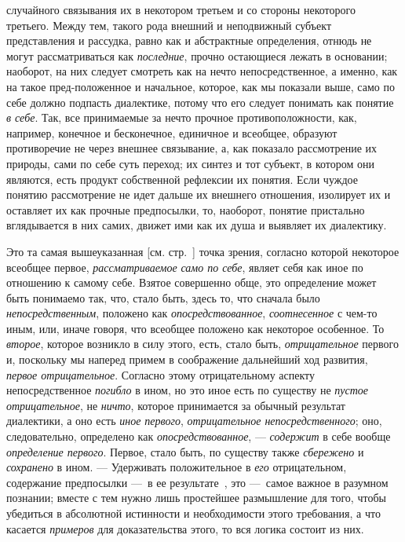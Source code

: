 \documentclass[twoside]{article}
\begin{document}
случайного связывания их в некотором третьем и со стороны некоторого
третьего. Между тем, такого рода внешний и неподвижный субъект
представления и рассудка, равно как и абстрактные определения, отнюдь не
могут рассматриваться как
{\em последние}, прочно
остающиеся лежать в основании; наоборот, на них следует
смотреть как на нечто непосредственное, а именно, как на такое
пред-положенное и начальное, которое, как мы показали выше, само по себе
должно подпасть диалектике, потому что его следует понимать как понятие
{\em в себе}. Так, все
принимаемые за нечто прочное противоположности, как, например, конечное и
бесконечное, единичное и всеобщее, образуют противоречие не через внешнее
связывание, а, как показало рассмотрение их природы, сами по себе суть
переход; их синтез и тот субъект, в котором они являются, есть продукт
собственной рефлексии их понятия. Если чуждое понятию рассмотрение не идет
дальше их внешнего отношения, изолирует их и оставляет их как прочные
предпосылки, то, наоборот, понятие пристально вглядывается в них самих,
движет ими как их душа и выявляет их диалектику.

Это та самая вышеуказанная [см. стр.~\pageref{bkm:bmpg224a}]
точка зрения, согласно которой некоторое всеобщее первое,
{\em рассматриваемое}
{\em само по себе}, являет
себя как иное по отношению к самому себе. Взятое совершенно обще, это
определение может быть понимаемо так, что, стало быть, здесь то, что
сначала было {\em непосредственным},
положено как
{\em опосредствованное},
{\em соотнесенное} с
чем-то иным, или, иначе говоря, что всеобщее положено как некоторое
особенное. То {\em второе},
которое возникло в силу этого, есть, стало быть,
{\em отрицательное}
первого и, поскольку мы наперед примем в соображение
дальнейший ход развития, {\em первое
отрицательное}. Согласно этому отрицательному аспекту
непосредственное {\em погибло}
в ином, но это иное есть по существу не
{\em пустое отрицательное},
не {\em ничто},
которое принимается за обычный результат диалектики, а оно
есть {\em иное первого},
{\em отрицательное непосредственного};
оно, следовательно, определено как
{\em опосредствованное}, —
{\em содержит} в себе
вообще {\em определение первого}.
Первое, стало быть, по существу также
{\em сбережено} и
{\em сохранено} в
ином. — Удерживать положительное в
{\em его} отрицательном,
содержание предпосылки —~в ее
результате~\label{bkm:bm124},
это —~самое важное в разумном познании; вместе
с тем нужно лишь простейшее размышление для того, чтобы убедиться в
абсолютной истинности и необходимости этого требования, а что касается
{\em примеров} для
доказательства этого, то вся логика состоит из них.
\end{document}
